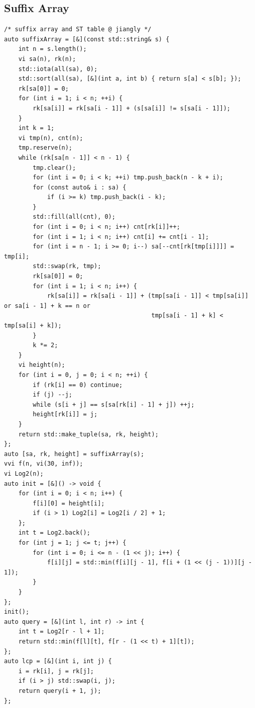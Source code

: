 \documentclass[UTF8, a4paper, titlepage, twoside]{ctexart}
\begin{document}
\subsection{ Suffix Array }
\begin{lstlisting}[style=cpp]
/* suffix array and ST table @ jiangly */
auto suffixArray = [&](const std::string& s) {
    int n = s.length();
    vi sa(n), rk(n);
    std::iota(all(sa), 0);
    std::sort(all(sa), [&](int a, int b) { return s[a] < s[b]; });
    rk[sa[0]] = 0;
    for (int i = 1; i < n; ++i) {
        rk[sa[i]] = rk[sa[i - 1]] + (s[sa[i]] != s[sa[i - 1]]);
    }
    int k = 1;
    vi tmp(n), cnt(n);
    tmp.reserve(n);
    while (rk[sa[n - 1]] < n - 1) {
        tmp.clear();
        for (int i = 0; i < k; ++i) tmp.push_back(n - k + i);
        for (const auto& i : sa) {
            if (i >= k) tmp.push_back(i - k);
        }
        std::fill(all(cnt), 0);
        for (int i = 0; i < n; i++) cnt[rk[i]]++;
        for (int i = 1; i < n; i++) cnt[i] += cnt[i - 1];
        for (int i = n - 1; i >= 0; i--) sa[--cnt[rk[tmp[i]]]] = tmp[i];
        std::swap(rk, tmp);
        rk[sa[0]] = 0;
        for (int i = 1; i < n; i++) {
            rk[sa[i]] = rk[sa[i - 1]] + (tmp[sa[i - 1]] < tmp[sa[i]] or sa[i - 1] + k == n or
                                         tmp[sa[i - 1] + k] < tmp[sa[i] + k]);
        }
        k *= 2;
    }
    vi height(n);
    for (int i = 0, j = 0; i < n; ++i) {
        if (rk[i] == 0) continue;
        if (j) --j;
        while (s[i + j] == s[sa[rk[i] - 1] + j]) ++j;
        height[rk[i]] = j;
    }
    return std::make_tuple(sa, rk, height);
};
auto [sa, rk, height] = suffixArray(s);
vvi f(n, vi(30, inf));
vi Log2(n);
auto init = [&]() -> void {
    for (int i = 0; i < n; i++) {
        f[i][0] = height[i];
        if (i > 1) Log2[i] = Log2[i / 2] + 1;
    };
    int t = Log2.back();
    for (int j = 1; j <= t; j++) {
        for (int i = 0; i <= n - (1 << j); i++) {
            f[i][j] = std::min(f[i][j - 1], f[i + (1 << (j - 1))][j - 1]);
        }
    }
};
init();
auto query = [&](int l, int r) -> int {
    int t = Log2[r - l + 1];
    return std::min(f[l][t], f[r - (1 << t) + 1][t]);
};
auto lcp = [&](int i, int j) {
    i = rk[i], j = rk[j];
    if (i > j) std::swap(i, j);
    return query(i + 1, j);
};
\end{lstlisting}
\end{document}
